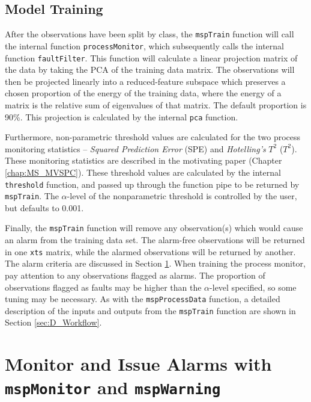 \documentclass{report}\usepackage[]{graphicx}\usepackage[]{color}
\begin{document}
\subsection{Model Training}
After the observations have been split by class, the \texttt{mspTrain} function will call the internal function \texttt{processMonitor}, which subsequently calls the internal function \texttt{faultFilter}. This function will calculate a linear projection matrix of the data by taking the PCA of the training data matrix. The observations will then be projected linearly into a reduced-feature subspace which preserves a chosen proportion of the energy of the training data, where the energy of a matrix is the relative sum of eigenvalues of that matrix. The default proportion is 90\%. This projection is calculated by the internal \texttt{pca} function.

Furthermore, non-parametric threshold values are calculated for the two process monitoring statistics -- \emph{Squared Prediction Error} (SPE) and \emph{Hotelling's} $T^2$ ($T^2$). These monitoring statistics are described in the motivating paper (Chapter \ref{chap:MS_MVSPC}). These threshold values are calculated by the internal \texttt{threshold} function, and passed up through the function pipe to be returned by \texttt{mspTrain}. The $\alpha$-level of the nonparametric threshold is controlled by the user, but defaults to 0.001.

Finally, the \texttt{mspTrain} function will remove any observation(s) which would cause an alarm from the training data set. The alarm-free observations will be returned in one \texttt{xts} matrix, while the alarmed observations will be returned by another. The alarm criteria are discussed in Section \ref{sec:D_Alarms}. When training the process monitor, pay attention to any observations flagged as alarms. The proportion of observations flagged as faults may be higher than the $\alpha$-level specified, so some tuning may be necessary. As with the \texttt{mspProcessData} function, a detailed description of the inputs and outputs from the \texttt{mspTrain} function are shown in Section \ref{sec:D_Workflow}.




\section{Monitor and Issue Alarms with \texttt{mspMonitor} and \texttt{mspWarning}} \label{sec:D_Alarms}
\end{document}
